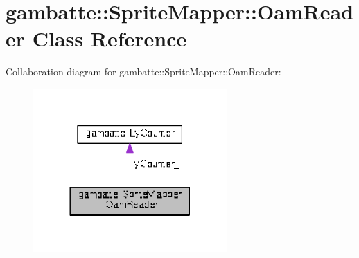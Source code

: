 \hypertarget{classgambatte_1_1SpriteMapper_1_1OamReader}{}\section{gambatte\+:\+:Sprite\+Mapper\+:\+:Oam\+Reader Class Reference}
\label{classgambatte_1_1SpriteMapper_1_1OamReader}


Collaboration diagram for gambatte\+:\+:Sprite\+Mapper\+:\+:Oam\+Reader\+:
\nopagebreak
\begin{figure}[H]
\begin{center}
\leavevmode
\includegraphics[width=209pt]{classgambatte_1_1SpriteMapper_1_1OamReader__coll__graph}
\end{center}
\end{figure}
